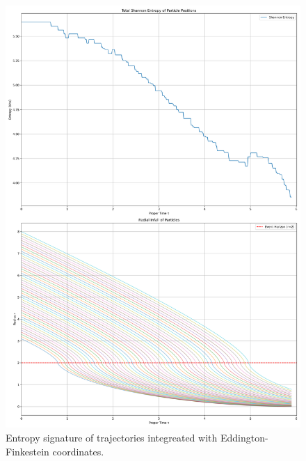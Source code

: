 \documentclass[11pt]{article}
\begin{document}
\begin{figure}[h!]
  \centering
  \includegraphics[width=\textwidth]{figures/schwarzschild_eddington_finkelstein.png}
  \caption{Entropy signature of trajectories integreated with Eddington-Finkestein coordinates.}
  \label{fig:schwarzschild_eddington_finkelstein}
\end{figure}
\end{document}
